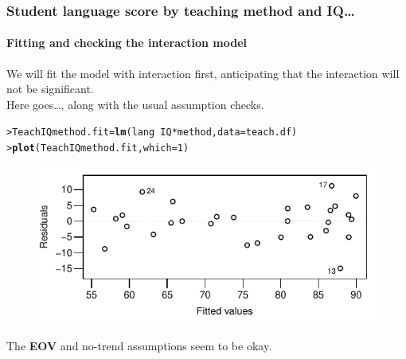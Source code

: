 \documentclass{beamer}\usepackage[]{graphicx}\usepackage[]{xcolor}
\makeatletter
\newcommand{\hlnum}[1]{\textcolor[rgb]{0.686,0.059,0.569}{#1}}%
\newcommand{\hlopt}[1]{\textcolor[rgb]{0,0,0}{#1}}%
\newcommand{\hlstd}[1]{\textcolor[rgb]{0.345,0.345,0.345}{#1}}%
\newcommand{\hlkwb}[1]{\textcolor[rgb]{0.69,0.353,0.396}{#1}}%
\newcommand{\hlkwc}[1]{\textcolor[rgb]{0.333,0.667,0.333}{#1}}%
\newcommand{\hlkwd}[1]{\textcolor[rgb]{0.737,0.353,0.396}{\textbf{#1}}}%
\newenvironment{kframe}{%
 \def\at@end@of@kframe{}%
 \ifinner\ifhmode%
  \def\at@end@of@kframe{\end{minipage}}%
  \begin{minipage}{\columnwidth}%
 \fi\fi%
 \def\FrameCommand##1{\hskip\@totalleftmargin \hskip-\fboxsep
 \colorbox{shadecolor}{##1}\hskip-\fboxsep
     \hskip-\linewidth \hskip-\@totalleftmargin \hskip\columnwidth}%
 \MakeFramed {\advance\hsize-\width
   \@totalleftmargin\z@ \linewidth\hsize
   \@setminipage}}%
 {\par\unskip\endMakeFramed%
 \at@end@of@kframe}
\newenvironment{knitrout}{}{} %
\makeatother
\begin{document}
\begin{frame}[fragile]
\frametitle{Student language score by  teaching method and IQ\ldots}
\framesubtitle{Fitting and checking the interaction model}
We will fit the model with interaction first, anticipating that the interaction will not be significant.\\
\medskip
Here goes\ldots, along with the usual assumption checks.\\
\medskip
\begin{knitrout}\scriptsize
{}\color{fgcolor}\begin{kframe}
\begin{alltt}
\hlstd{> }\hlstd{TeachIQmethod.fit}\hlkwb{=}\hlkwd{lm}\hlstd{(lang}\hlopt{~}\hlstd{IQ}\hlopt{*}\hlstd{method,} \hlkwc{data}\hlstd{=teach.df)}
\hlstd{> }\hlkwd{plot}\hlstd{(TeachIQmethod.fit,} \hlkwc{which} \hlstd{=} \hlnum{1}\hlstd{)}
\end{alltt}
\end{kframe}
\end{knitrout}


\begin{figure}
  \centering
  \includegraphics{figure/RC-H09-009}
\end{figure}

The \textbf{EOV} and no-trend assumptions seem to be okay.
\end{frame}
\end{document}
